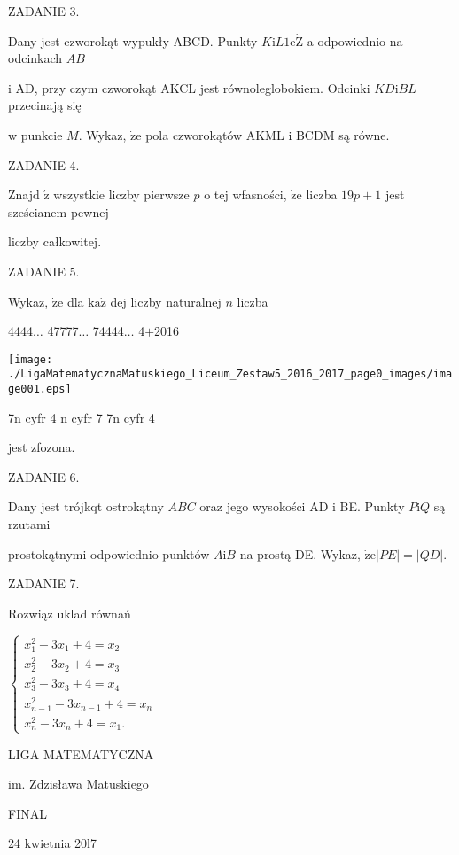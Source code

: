 \documentclass[a4paper,12pt]{article}
\begin{document}
ZADANIE 3.

Dany jest czworokąt wypukły ABCD. Punkty $K \mathrm{i} L 1\mathrm{e}\dot{\mathrm{Z}}$ a odpowiednio na odcinkach $AB$

$\mathrm{i}$ AD, przy czym czworokąt AKCL jest równoleglobokiem. Odcinki $KD\mathrm{i}BL$ przecinają się

w punkcie $M$. Wykaz, $\dot{\mathrm{z}}\mathrm{e}$ pola czworokątów AKML $\mathrm{i}$ BCDM są równe.

ZADANIE 4.

Znajd $\acute{\mathrm{z}}$ wszystkie liczby pierwsze $p$ o tej wfasności, $\dot{\mathrm{z}}\mathrm{e}$ liczba $19p+1$ jest sześcianem pewnej

liczby całkowitej.

ZADANIE 5.

Wykaz, $\dot{\mathrm{z}}\mathrm{e}$ dla $\mathrm{k}\mathrm{a}\dot{\mathrm{z}}$ dej liczby naturalnej $n$ liczba

4444$\ldots$ 47777$\ldots$ 74444$\ldots$ 4$+$2016
\begin{center}
\texttt{[image: ./LigaMatematycznaMatuskiego\_Liceum\_Zestaw5\_2016\_2017\_page0\_images/image001.eps]}
\end{center}
7n cyfr 4 n cyfr 7  7n cyfr 4

jest zfozona.

ZADANIE 6.

Dany jest trójkqt ostrokątny $ABC$ oraz jego wysokości AD $\mathrm{i}$ BE. Punkty $P\mathrm{i}Q$ są rzutami

prostokątnymi odpowiednio punktów $A\mathrm{i}B$ na prostą DE. Wykaz, $\dot{\mathrm{z}}\mathrm{e}|PE|=|QD|.$

ZADANIE 7.

Rozwiąz uklad równań

$\left\{\begin{array}{l}
x_{1}^{2}-3x_{1}+4=x_{2}\\
x_{2}^{2}-3x_{2}+4=x_{3}\\
x_{3}^{2}-3x_{3}+4=x_{4}\\
x_{n-1}^{2}-3x_{n-1}+4=x_{n}\\
x_{n}^{2}-3x_{n}+4=x_{1}.
\end{array}\right.$






LIGA MATEMATYCZNA

im. Zdzisława Matuskiego

FINAL

24 kwietnia 20l7
\end{document}
